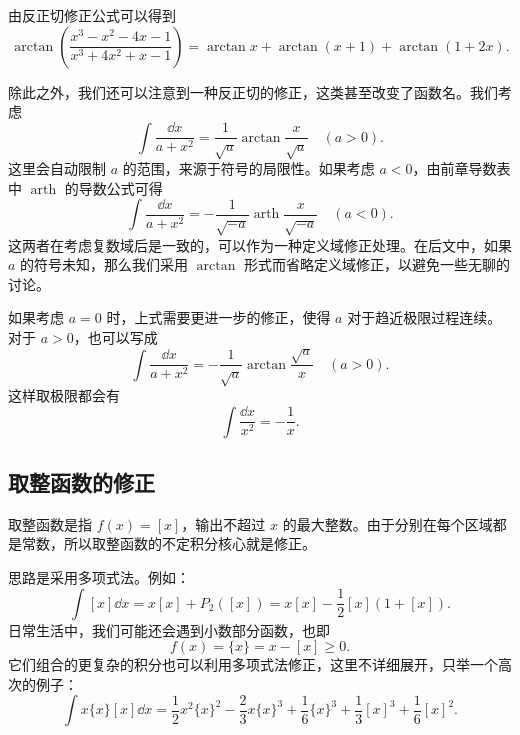 \begin{example}
	由反正切修正公式可以得到
	\[
	\arctan\left(\frac{x^3-x^2-4x-1}{x^3+4x^2+x-1}\right)
	=\arctan x+\arctan(x+1)+\arctan(1+2x).
	\]
\end{example}

除此之外，我们还可以注意到一种反正切的修正，这类甚至改变了函数名。我们考虑
\[
\int\frac{\dd x}{a+x^2}
=\frac1{\sqrt a}\arctan\frac{x}{\sqrt a}\quad(a>0). \tag{1.21}
\]
这里会自动限制 $a$ 的范围，来源于符号的局限性。如果考虑 $a<0$，由前章导数表中 $\operatorname{arth}$ 的导数公式可得
\[
\int\frac{\dd x}{a+x^2}
=-\frac1{\sqrt{-a}}\operatorname{arth}\frac{x}{\sqrt{-a}}\quad(a<0). 
\]
这两者在考虑复数域后是一致的，可以作为一种定义域修正处理。在后文中，如果 $a$ 的符号未知，那么我们采用 $\arctan$ 形式而省略定义域修正，以避免一些无聊的讨论。

如果考虑 $a=0$ 时，上式需要更进一步的修正，使得 $a$ 对于趋近极限过程连续。对于 $a>0$，也可以写成
\[
\int\frac{\dd x}{a+x^2}
=-\frac1{\sqrt a}\arctan\frac{\sqrt a}{x}\quad(a>0). 
\]
这样取极限都会有
\[
\int\frac{\dd x}{x^2}=-\frac1x. 
\]

\subsection*{取整函数的修正}

取整函数是指 $f(x)=[x]$，输出不超过 $x$ 的最大整数。由于分别在每个区域都是常数，所以取整函数的不定积分核心就是修正。

思路是采用多项式法。例如：
\[
\int [x]\dd x=x[x]+P_2([x])=x[x]-\frac12[x](1+[x]). 
\]
日常生活中，我们可能还会遇到小数部分函数，也即
\[
f(x)=\{x\}=x-[x]\geq0. 
\]
它们组合的更复杂的积分也可以利用多项式法修正，这里不详细展开，只举一个高次的例子：
\[
\int x\{x\}[x]\dd x
=\frac12x^2\{x\}^2-\frac23x\{x\}^3
+\frac16\{x\}^3+\frac13[x]^3+\frac16[x]^2. 
\]




